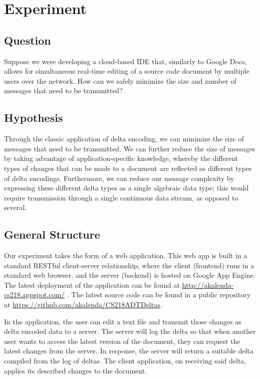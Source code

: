 \documentclass[12pt,a4paper]{article}
\begin{document}
	\section{Experiment}
	
		\subsection{Question}
		
		Suppose we were developing a cloud-based IDE that, similarly to Google Docs, allows for simultaneous real-time editing of a source code document by multiple users over the network. How can we safely minimize the size and number of messages that need to be transmitted?
	
		\subsection{Hypothesis}
			
		Through the classic application of delta encoding, we can minimize the size of messages that need to be transmitted. We can further reduce the size of messages by taking advantage of application-specific knowledge, whereby the different types of changes that can be made to a document are reflected as different types of delta encodings. Furthermore, we can reduce our message complexity by expressing these different delta types as a single algebraic data type; this would require transmission through a single continuous data stream, as opposed to several.
		
		\subsection{General Structure}
		
		Our experiment takes the form of a web application. This web app is built in a standard RESTful client-server relationship, where the client (frontend) runs in a standard web browser, and the server (backend) is hosted on Google App Engine. The latest deployment of the application can be found at \url{http://akalenda-cs218.appspot.com/} . The latest source code can be found in a public repository at \url{https://github.com/akalenda/CS218ADTDeltas}.
		
		In the application, the user can edit a text file and transmit those changes as delta encoded data to a server. The server will log the delta so that when another user wants to access the latest version of the document, they can request the latest changes from the server. In response, the server will return a suitable delta compiled from the log of deltas. The client application, on receiving said delta, applies its described changes to the document.
		
\end{document}
